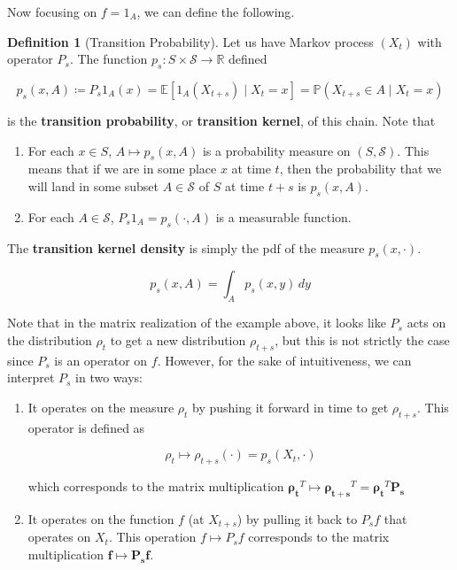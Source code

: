 \documentclass{article}
\theoremstyle{definition}
\theoremstyle{remark}
\theoremstyle{definition}
\newtheorem{definition}{Definition}[section]
\begin{document}
  Now focusing on $f = 1_A$, we can define the following. 

  \begin{definition}[Transition Probability]
  Let us have Markov process $(X_t)$ with operator $P_s$. The function $p_s: S \times \mathcal{S} \rightarrow \mathbb{R}$ defined 

    \[p_s(x, A) \coloneqq P_s 1_A (x) = \mathbb{E}[ 1_A (X_{t+s}) \mid X_t = x] = \mathbb{P}(X_{t + s} \in A \mid X_t = x)\]

  is the \textbf{transition probability}, or \textbf{transition kernel}, of this chain. Note that 

  \begin{enumerate}
    \item For each $x \in S$, $A \mapsto p_s(x, A)$ is a probability measure on $(S, \mathcal{S})$. This means that if we are in some place $x$ at time $t$, then the probability that we will land in some subset $A \in \mathcal{S}$ of $S$ at time $t + s$ is $p_s(x, A)$. 
    \item For each $A \in \mathcal{S}$, $P_s 1_A = p_s (\cdot, A)$ is a measurable function. 
  \end{enumerate}
  The \textbf{transition kernel density} is simply the pdf of the measure $p_s(x, \cdot)$. 

    \[p_s(x, A) = \int_A p_s (x, y) \,dy\]
  \end{definition}

  Note that in the matrix realization of the example above, it looks like $P_s$ acts on the distribution $\rho_t$ to get a new distribution $\rho_{t + s}$, but this is not strictly the case since $P_s$ is an operator on $f$. However, for the sake of intuitiveness, we can interpret $P_s$ in two ways: 

  \begin{enumerate}
    \item It operates on the measure $\rho_t$ by pushing it forward in time to get $\rho_{t + s}$. This operator is defined as 

      \[\rho_t \mapsto \rho_{t + s}(\cdot) = p_s (X_t, \cdot)\]

    which corresponds to the matrix multiplication $\boldsymbol{\rho_t}^T \mapsto \boldsymbol{\rho_{t + s}}^T = \boldsymbol{\rho_{t}}^T \mathbf{P_s}$

    \item It operates on the function $f$ (at $X_{t + s}$) by pulling it back to $P_s f$ that operates on $X_t$. This operation $f \mapsto P_s f$ corresponds to the matrix multiplication $\mathbf{f} \mapsto \mathbf{P_s} \mathbf{f}$. 

  \end{enumerate}
\end{document}

